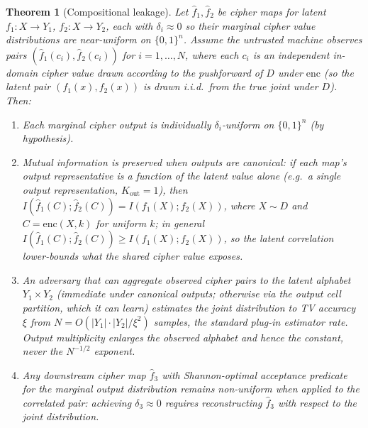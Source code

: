 \documentclass[11pt]{article}
\theoremstyle{definition}
\theoremstyle{plain}
\newtheorem{theorem}{Theorem}[section]
\theoremstyle{remark}
\newcommand{\fhat}{\hat{f}}
\newcommand{\enc}{\mathrm{enc}}
\newcommand{\B}{\{0,1\}}
\begin{document}
\begin{theorem}[Compositional leakage]
\label{thm:comp-leakage}
Let $\fhat_1, \fhat_2$ be cipher maps for latent $f_1 : X \to Y_1$,
$f_2 : X \to Y_2$, each with $\delta_i \approx 0$ so their marginal
cipher value distributions are near-uniform on $\B^n$.  Assume the
untrusted machine observes pairs $(\fhat_1(c_i), \fhat_2(c_i))$ for
$i = 1, \ldots, N$, where each $c_i$ is an independent in-domain
cipher value drawn according to the pushforward of $D$ under $\enc$
(so the latent pair $(f_1(x), f_2(x))$ is drawn i.i.d.\ from the
true joint under $D$).  Then:
\begin{enumerate}
\item Each marginal cipher output is individually $\delta_i$-uniform on
  $\B^n$ (by hypothesis).
\item Mutual information is preserved when outputs are canonical: if each
  map's output representative is a function of the latent value alone
  (e.g.\ a single output representation, $K_{\mathrm{out}} = 1$), then
  $I(\fhat_1(C); \fhat_2(C)) = I(f_1(X); f_2(X))$, where $X \sim D$ and
  $C = \enc(X, k)$ for uniform $k$; in general
  $I(\fhat_1(C); \fhat_2(C)) \geq I(f_1(X); f_2(X))$, so the latent
  correlation lower-bounds what the shared cipher value exposes.
\item An adversary that can aggregate observed cipher pairs to the latent
  alphabet $Y_1 \times Y_2$ (immediate under canonical outputs; otherwise
  via the output cell partition, which it can learn) estimates the joint
  distribution to TV accuracy $\xi$ from
  $N = O(|Y_1| \cdot |Y_2| / \xi^2)$ samples, the standard plug-in
  estimator rate.  Output multiplicity enlarges the observed alphabet and
  hence the constant, never the $N^{-1/2}$ exponent.
\item Any downstream cipher map $\fhat_3$ with Shannon-optimal
  acceptance predicate for the \emph{marginal} output distribution
  remains non-uniform when applied to the correlated pair:
  achieving $\delta_3 \approx 0$ requires reconstructing $\fhat_3$ with
  respect to the joint distribution.
\end{enumerate}
\end{theorem}
\end{document}
